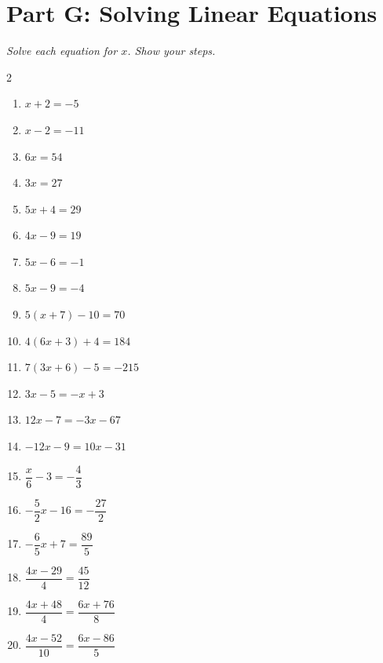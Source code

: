 \documentclass[11pt]{article}
\begin{document}
\section*{Part G: Solving Linear Equations}
\noindent\textit{Solve each equation for $x$. Show your steps.}
\begin{multicols}{2}
\begin{enumerate}
  \item $x + 2 = -5$
  \vspace{2.0cm}
  \item $x - 2 = -11$
  \vspace{2.0cm}
  \item $6x = 54$
  \vspace{2.0cm}
  \item $3x = 27$
  \vspace{2.0cm}
  \item $5x + 4 = 29$
  \vspace{2.0cm}
  \item $4x - 9 = 19$
  \vspace{2.0cm}
  \item $5x - 6 = -1$
  \vspace{2.0cm}
  \item $5x - 9 = -4$
  \vspace{2.0cm}
  \item $5(x + 7) - 10 = 70$
  \vspace{2.0cm}
  \item $4(6x + 3) + 4 = 184$
  \vspace{2.0cm}
  \item $7(3x + 6) - 5 = -215$
  \vspace{2.0cm}
  \item $3x - 5 = -x + 3$
  \vspace{2.0cm}
  \item $12x - 7 = -3x - 67$
  \vspace{2.0cm}
  \item $-12x - 9 = 10x - 31$
  \vspace{2.0cm}
  \item $\dfrac{x}{6} - 3 = -\dfrac{4}{3}$
  \vspace{2.0cm}
  \item $-\dfrac{5}{2}x - 16 = -\dfrac{27}{2}$
  \vspace{2.0cm}
  \item $-\dfrac{6}{5}x + 7 = \dfrac{89}{5}$
  \vspace{2.0cm}
  \item $\dfrac{4x - 29}{4} = \dfrac{45}{12}$
  \vspace{2.0cm}
  \item $\dfrac{4x + 48}{4} = \dfrac{6x + 76}{8}$
  \vspace{2.0cm}
  \item $\dfrac{4x - 52}{10} = \dfrac{6x - 86}{5}$
  \vspace{2.0cm}
\end{enumerate}
\end{multicols}
\end{document}
